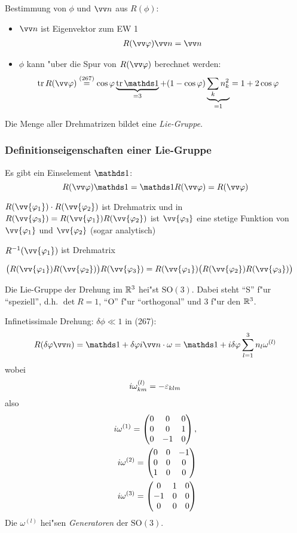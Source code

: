 \documentclass[a4paper]{scrartcl}
\begin{document}
{Bestimmung von $\phi$ und $\vv n$ aus $R(\phi)$:
\begin{itemize}
\item $\vv n$ ist Eigenvektor zum EW 1
\begin{align}
R(\vv \phi) \vv n = \vv n
\end{align}
\item $\phi$ kann "uber die Spur von $R(\vv \phi)$ berechnet werden:
\begin{align}
\tr R(\vv \phi) & \stackrel{(267)}= \cos \phi \underbrace{ \tr \dOne}_{=3} + (1 - \cos \phi) \underbrace{\sum_k n_k^2 }_{=1} = 1 + 2 \cos \phi
\end{align}
\end{itemize}
Die Menge aller Drehmatrizen bildet eine \emph{Lie-Gruppe}.

\subsubsection*{Definitionseigenschaften einer Lie-Gruppe}

\begin{1aufz}
\item Es gibt ein Einselement $\dOne$:
$$R(\vv \phi) \dOne = \dOne R(\vv \phi) = R( \vv \phi)$$
\item $R(\vv{\phi_1} ) \cdot R( \vv {\phi_2})$ ist Drehmatrix und in $R(\vv{\phi_3}) = R(\vv{\phi_1})R(\vv{\phi_2})$ ist $\vv{\phi_3}$ eine stetige Funktion von $\vv{\phi_1}$ und $\vv {\phi_2}$ (sogar analytisch)
\item $R^{-1}(\vv{\phi_1})$ ist Drehmatrix 
\item $\big( R(\vv{\phi_1}) R(\vv{\phi_2}) \big) R(\vv{\phi_3}) = R(\vv{\phi_1}) \big( R(\vv{\phi_2})R(\vv{\phi_3}) \big)$
\end{1aufz}
Die Lie-Gruppe der Drehung im $\mathbb{R}^3$ hei"st $\mathrm{SO}(3)$. Dabei steht "`S"' f"ur "`speziell"', d.h. $\det R = 1$, "`O"' f"ur "`orthogonal"' und 3 f"ur den $\mathbb{R}^3$.

Infinetissimale Drehung: $\delta \phi \ll 1$ in (267):
\begin{align}
R( \delta \phi \vv n) = \dOne + \delta \phi i \vv n \cdot  \omega = \dOne + i \delta \phi \sum_{l=1}^3 n_l \omega^{(l)}
\end{align}
wobei
\begin{align}
i \omega_{km}^{(l)}  = - \varepsilon_{klm}
\end{align}
also
\begin{align}
i \omega^{(1)} = \begin{pmatrix} 0 & 0 & 0 \\ 0 & 0 & 1 \\ 0 & -1 & 0 \end{pmatrix}, \\
i \omega^{(2)} = \begin{pmatrix}  0 & 0 & -1 \\ 0 & 0 & 0 \\ 1 & 0 & 0  \end{pmatrix} \\
i \omega^{(3)} = \begin{pmatrix}  0 & 1 & 0 \\ -1 & 0 & 0 \\ 0 & 0 & 0  \end{pmatrix}
\end{align}
Die $\omega^{(l)}$ hei"sen \emph{Generatoren} der $\mathrm{SO}(3)$.

}
\end{document}
